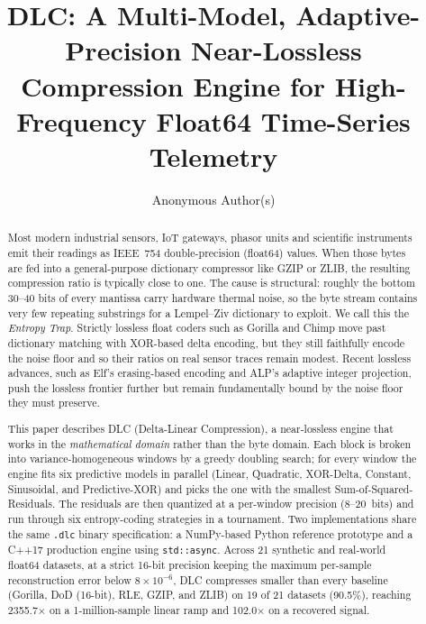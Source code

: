 \documentclass[runningheads]{llncs}
\begin{document}
\title{DLC: A Multi-Model, Adaptive-Precision Near-Lossless Compression Engine for High-Frequency Float64 Time-Series Telemetry}

\author{Anonymous Author(s)}

\maketitle

\begin{abstract}
Most modern industrial sensors, IoT gateways, phasor units and scientific instruments emit their readings as IEEE~754 double-precision (float64) values. When those bytes are fed into a general-purpose dictionary compressor like GZIP or ZLIB, the resulting compression ratio is typically close to one. The cause is structural: roughly the bottom 30--40 bits of every mantissa carry hardware thermal noise, so the byte stream contains very few repeating substrings for a Lempel--Ziv dictionary to exploit. We call this the \emph{Entropy Trap}. Strictly lossless float coders such as Gorilla and Chimp move past dictionary matching with XOR-based delta encoding, but they still faithfully encode the noise floor and so their ratios on real sensor traces remain modest. Recent lossless advances, such as Elf's erasing-based encoding and ALP's adaptive integer projection, push the lossless frontier further but remain fundamentally bound by the noise floor they must preserve.

This paper describes DLC (Delta-Linear Compression), a near-lossless engine that works in the \emph{mathematical domain} rather than the byte domain. Each block is broken into variance-homogeneous windows by a greedy doubling search; for every window the engine fits six predictive models in parallel (Linear, Quadratic, XOR-Delta, Constant, Sinusoidal, and Predictive-XOR) and picks the one with the smallest Sum-of-Squared-Residuals. The residuals are then quantized at a per-window precision (8--20~bits) and run through six entropy-coding strategies in a tournament. Two implementations share the same \texttt{.dlc} binary specification: a NumPy-based Python reference prototype and a C++17 production engine using \texttt{std::async}. Across 21 synthetic and real-world float64 datasets, at a strict 16-bit precision keeping the maximum per-sample reconstruction error below $8 \times 10^{-6}$, DLC compresses smaller than every baseline (Gorilla, DoD (16-bit), RLE, GZIP, and ZLIB) on 19 of 21 datasets (90.5\%), reaching 2355.7$\times$ on a 1-million-sample linear ramp and 102.0$\times$ on a recovered signal.

\end{abstract}
\end{document}
